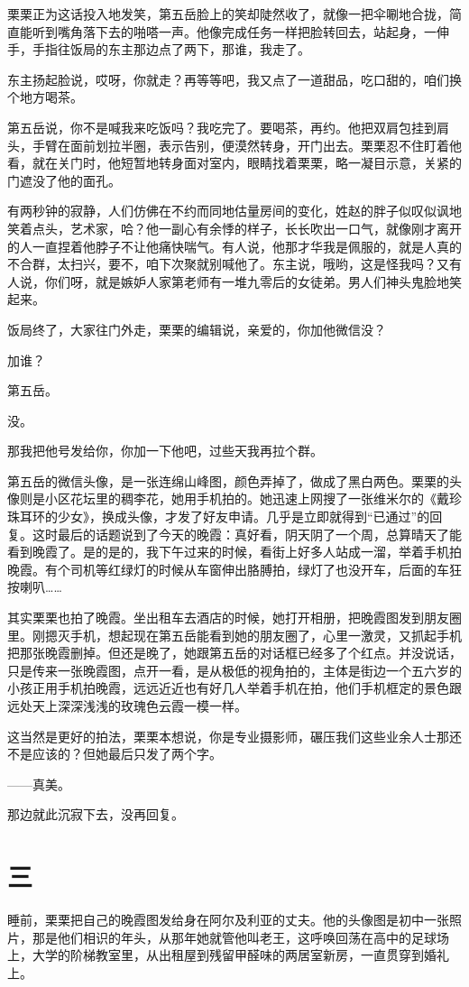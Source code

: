 \documentclass[lang=cn,newtx,12pt,scheme=chinese]{elegantbook}
\begin{document}
栗栗正为这话投入地发笑，第五岳脸上的笑却陡然收了，就像一把伞唰地合拢，简直能听到嘴角落下去的啪嗒一声。他像完成任务一样把脸转回去，站起身，一伸手，手指往饭局的东主那边点了两下，那谁，我走了。

东主扬起脸说，哎呀，你就走？再等等吧，我又点了一道甜品，吃口甜的，咱们换个地方喝茶。

第五岳说，你不是喊我来吃饭吗？我吃完了。要喝茶，再约。他把双肩包挂到肩头，手臂在面前划拉半圈，表示告别，便漠然转身，开门出去。栗栗忍不住盯着他看，就在关门时，他短暂地转身面对室内，眼睛找着栗栗，略一凝目示意，关紧的门遮没了他的面孔。

有两秒钟的寂静，人们仿佛在不约而同地估量房间的变化，姓赵的胖子似叹似讽地笑着点头，艺术家，哈？他一副心有余悸的样子，长长吹出一口气，就像刚才离开的人一直捏着他脖子不让他痛快喘气。有人说，他那才华我是佩服的，就是人真的不合群，太扫兴，要不，咱下次聚就别喊他了。东主说，哦哟，这是怪我吗？又有人说，你们呀，就是嫉妒人家第老师有一堆九零后的女徒弟。男人们神头鬼脸地笑起来。

饭局终了，大家往门外走，栗栗的编辑说，亲爱的，你加他微信没？

加谁？

第五岳。

没。

那我把他号发给你，你加一下他吧，过些天我再拉个群。

第五岳的微信头像，是一张连绵山峰图，颜色弄掉了，做成了黑白两色。栗栗的头像则是小区花坛里的稠李花，她用手机拍的。她迅速上网搜了一张维米尔的《戴珍珠耳环的少女》，换成头像，才发了好友申请。几乎是立即就得到“已通过”的回复。这时最后的话题说到了今天的晚霞：真好看，阴天阴了一个周，总算晴天了能看到晚霞了。是的是的，我下午过来的时候，看街上好多人站成一溜，举着手机拍晚霞。有个司机等红绿灯的时候从车窗伸出胳膊拍，绿灯了也没开车，后面的车狂按喇叭……

其实栗栗也拍了晚霞。坐出租车去酒店的时候，她打开相册，把晚霞图发到朋友圈里。刚摁灭手机，想起现在第五岳能看到她的朋友圈了，心里一激灵，又抓起手机把那张晚霞删掉。但还是晚了，她跟第五岳的对话框已经多了个红点。并没说话，只是传来一张晚霞图，点开一看，是从极低的视角拍的，主体是街边一个五六岁的小孩正用手机拍晚霞，远远近近也有好几人举着手机在拍，他们手机框定的景色跟远处天上深深浅浅的玫瑰色云霞一模一样。

这当然是更好的拍法，栗栗本想说，你是专业摄影师，碾压我们这些业余人士那还不是应该的？但她最后只发了两个字。

——真美。

那边就此沉寂下去，没再回复。
\section{三}
睡前，栗栗把自己的晚霞图发给身在阿尔及利亚的丈夫。他的头像图是初中一张照片，那是他们相识的年头，从那年她就管他叫老王，这呼唤回荡在高中的足球场上，大学的阶梯教室里，从出租屋到残留甲醛味的两居室新房，一直贯穿到婚礼上。
\end{document}
